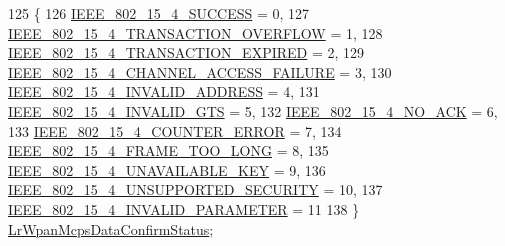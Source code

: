 \begin{DoxyCode}
125 \{
126   \hyperlink{group__lr-wpan_gga50d67c8816b2ca8da8df30d045b1b705a9fcca1742a3f5fd112aab55e786a0124}{IEEE\_802\_15\_4\_SUCCESS}                = 0,
127   \hyperlink{group__lr-wpan_gga50d67c8816b2ca8da8df30d045b1b705a2ec9f44eb72724c5d04c178e54a7a2c2}{IEEE\_802\_15\_4\_TRANSACTION\_OVERFLOW}   = 1,
128   \hyperlink{group__lr-wpan_gga50d67c8816b2ca8da8df30d045b1b705ac4e0b58eaa2e70b5dff066fa18228501}{IEEE\_802\_15\_4\_TRANSACTION\_EXPIRED}    = 2,
129   \hyperlink{group__lr-wpan_gga50d67c8816b2ca8da8df30d045b1b705a4973a75e0ff2c1f73181e773b0e6daaa}{IEEE\_802\_15\_4\_CHANNEL\_ACCESS\_FAILURE} = 3,
130   \hyperlink{group__lr-wpan_gga50d67c8816b2ca8da8df30d045b1b705a4a8505d97c4183f601f17d5362bada9d}{IEEE\_802\_15\_4\_INVALID\_ADDRESS}        = 4,
131   \hyperlink{group__lr-wpan_gga50d67c8816b2ca8da8df30d045b1b705a2f444e3e196f713538a12c768c23b741}{IEEE\_802\_15\_4\_INVALID\_GTS}            = 5,
132   \hyperlink{group__lr-wpan_gga50d67c8816b2ca8da8df30d045b1b705a41f6dfd2ce069ea23beba15a41c09c25}{IEEE\_802\_15\_4\_NO\_ACK}                 = 6,
133   \hyperlink{group__lr-wpan_gga50d67c8816b2ca8da8df30d045b1b705a64c8fbd15faf281cf0d5291d6742d0c2}{IEEE\_802\_15\_4\_COUNTER\_ERROR}          = 7,
134   \hyperlink{group__lr-wpan_gga50d67c8816b2ca8da8df30d045b1b705ab8d737a09f0b50d7c2dc000179e9e38d}{IEEE\_802\_15\_4\_FRAME\_TOO\_LONG}         = 8,
135   \hyperlink{group__lr-wpan_gga50d67c8816b2ca8da8df30d045b1b705ad093ea3e72eaaf05150420810bf7998e}{IEEE\_802\_15\_4\_UNAVAILABLE\_KEY}        = 9,
136   \hyperlink{group__lr-wpan_gga50d67c8816b2ca8da8df30d045b1b705a33bbc5f89599b460377deed599df7dcb}{IEEE\_802\_15\_4\_UNSUPPORTED\_SECURITY}   = 10,
137   \hyperlink{group__lr-wpan_gga50d67c8816b2ca8da8df30d045b1b705a5c8b06d425e18155370ce481538e74de}{IEEE\_802\_15\_4\_INVALID\_PARAMETER}      = 11
138 \} \hyperlink{group__lr-wpan_ga50d67c8816b2ca8da8df30d045b1b705}{LrWpanMcpsDataConfirmStatus};
\end{DoxyCode}
